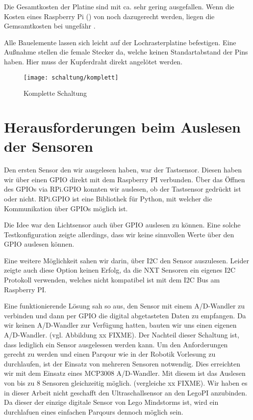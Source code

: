 Die Gesamtkosten der Platine sind mit ca.  sehr gering ausgefallen. Wenn die Kosten eines Raspberry Pi () von noch dazugerecht werden, liegen die Gemsamtkosten bei ungefähr .

Alle Bauelemente lassen sich leicht auf der Lochrasterplatine befestigen. Eine Außnahme stellen die female Stecker da, welche keinen Standartabstand der Pins haben. Hier muss der Kupferdraht direkt angelötet werden.

\begin{figure}[h]
  \centering
  \texttt{[image: schaltung/komplett]}
  \caption{Komplette Schaltung}
  \label{schaltung:komplett}
\end{figure}

\clearpage

\section{Herausforderungen beim Auslesen der Sensoren}

Den ersten Sensor den wir ausgelesen haben, war der Tastsensor. Diesen haben wir über einen GPIO direkt mit dem Raspberry PI verbunden.
Über das Öffnen des GPIOs via RPi.GPIO konnten wir auslesen, ob der Tastsensor gedrückt ist oder nicht. RPi.GPIO ist eine Bibliothek für Python, mit welcher die Kommunikation über GPIOs möglich ist.

Die Idee war den Lichtsensor auch über GPIO auslesen zu können. Eine solche Testkonfiguration zeigte allerdings, dass wir keine sinnvollen Werte über den GPIO auslesen können. 

Eine weitere Möglichkeit sahen wir darin, über I2C den Sensor auszulesen. Leider zeigte auch diese Option keinen Erfolg, da die NXT Sensoren ein eigenes I2C  Protokoll verwenden, welches nicht kompatibel ist mit dem I2C Bus am Raspberry PI. 

Eine funktionierende Lösung sah so aus, den Sensor mit einem A/D-Wandler zu verbinden und dann per GPIO die digital abgetasteten Daten zu empfangen. Da wir keinen A/D-Wandler zur Verfügung hatten, bauten wir uns einen eigenen A/D-Wandler. (vgl. Abbildung xx FIXME). Der Nachteil dieser Schaltung ist, dass lediglich ein Sensor ausgelessen werden kann. Um den Anforderungen gerecht zu werden und einen Parqour wie in der Robotik Vorlesung zu durchlaufen, ist der Einsatz von mehreren Sensoren notwendig. Dies erreichten wir mit dem Einsatz eines MCP3008 A/D-Wandler. Mit diesem ist das Auslesen von bis zu 8 Sensoren gleichzeitig möglich. (vergleiche xx FIXME). Wir haben es in dieser Arbeit nicht geschafft den Ultraschallsensor an den LegoPI anzubinden. Da dieser der einzige digitale Sensor von Lego Mindstorms ist, wird ein durchlafuen eines einfachen Parqours dennoch möglich sein.

